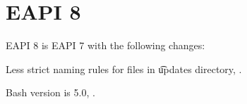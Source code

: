 \section{EAPI 8}

EAPI 8 is EAPI 7 with the following changes:

\begin{compactitem}
\item Less strict naming rules for files in \t{updates} directory, .
\item Bash version is 5.0, .
\end{compactitem}



